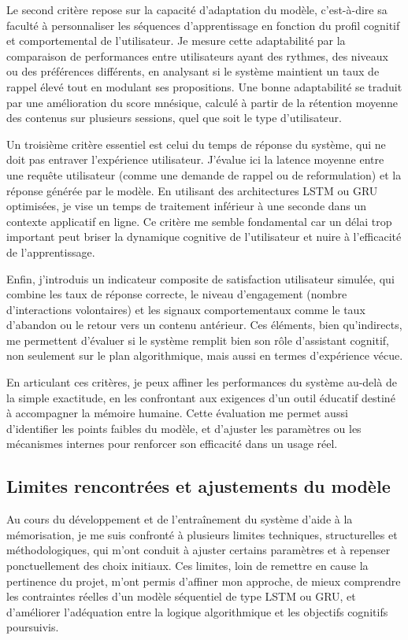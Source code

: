 \documentclass[11pt,a4paper]{report}
\begin{document}
Le second critère repose sur la capacité d’adaptation du modèle, c’est-à-dire sa faculté à personnaliser les séquences d’apprentissage en fonction du profil cognitif et comportemental de l’utilisateur. Je mesure cette adaptabilité par la comparaison de performances entre utilisateurs ayant des rythmes, des niveaux ou des préférences différents, en analysant si le système maintient un taux de rappel élevé tout en modulant ses propositions. Une bonne adaptabilité se traduit par une amélioration du score mnésique, calculé à partir de la rétention moyenne des contenus sur plusieurs sessions, quel que soit le type d’utilisateur.

Un troisième critère essentiel est celui du temps de réponse du système, qui ne doit pas entraver l’expérience utilisateur. J’évalue ici la latence moyenne entre une requête utilisateur (comme une demande de rappel ou de reformulation) et la réponse générée par le modèle. En utilisant des architectures LSTM ou GRU optimisées, je vise un temps de traitement inférieur à une seconde dans un contexte applicatif en ligne. Ce critère me semble fondamental car un délai trop important peut briser la dynamique cognitive de l’utilisateur et nuire à l’efficacité de l’apprentissage.

Enfin, j’introduis un indicateur composite de satisfaction utilisateur simulée, qui combine les taux de réponse correcte, le niveau d’engagement (nombre d’interactions volontaires) et les signaux comportementaux comme le taux d’abandon ou le retour vers un contenu antérieur. Ces éléments, bien qu’indirects, me permettent d’évaluer si le système remplit bien son rôle d’assistant cognitif, non seulement sur le plan algorithmique, mais aussi en termes d’expérience vécue.

En articulant ces critères, je peux affiner les performances du système au-delà de la simple exactitude, en les confrontant aux exigences d’un outil éducatif destiné à accompagner la mémoire humaine. Cette évaluation me permet aussi d’identifier les points faibles du modèle, et d’ajuster les paramètres ou les mécanismes internes pour renforcer son efficacité dans un usage réel.

\subsection{Limites rencontrées et ajustements du modèle}

Au cours du développement et de l’entraînement du système d’aide à la mémorisation, je me suis confronté à plusieurs limites techniques, structurelles et méthodologiques, qui m’ont conduit à ajuster certains paramètres et à repenser ponctuellement des choix initiaux. Ces limites, loin de remettre en cause la pertinence du projet, m’ont permis d’affiner mon approche, de mieux comprendre les contraintes réelles d’un modèle séquentiel de type LSTM ou GRU, et d’améliorer l’adéquation entre la logique algorithmique et les objectifs cognitifs poursuivis.
\end{document}
